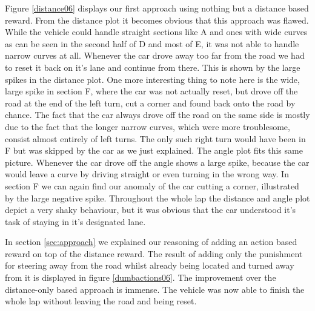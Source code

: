 Figure \ref{distance06} displays our first approach using nothing but a distance based reward. From the distance plot it becomes obvious that this approach was flawed. While the vehicle could handle straight sections like A and ones with wide curves as can be seen in the second half of D and most of E, it was not able to handle narrow curves at all. Whenever the car drove away too far from the road we had to reset it back on it's lane and continue from there. This is shown by the large spikes in the distance plot. One more interesting thing to note here is the wide, large spike in section F, where the car was not actually reset, but drove off the road at the end of the left turn, cut a corner and found back onto the road by chance. The fact that the car always drove off the road on the same side is mostly due to the fact that the longer narrow curves, which were more troublesome, consist almost entirely of left turns. The only such right turn would have been in F but was skipped by the car as we just explained. 
The angle plot fits this same picture. Whenever the car drove off the angle shows a large spike, because the car would leave a curve by driving straight or even turning in the wrong way. In section F we can again find our anomaly of the car cutting a corner, illustrated by the large negative spike.
Throughout the whole lap the distance and angle plot depict a very shaky behaviour, but it was obvious that the car understood it's task of staying in it's designated lane.

In section \ref{sec:approach} we explained our reasoning of adding an action based reward on top of the distance reward. The result of adding only the punishment for steering away from the road whilst already being located and turned away from it is displayed in figure \ref{dumbactions06}. The improvement over the distance-only based approach is immense. The vehicle was now able to finish the whole lap without leaving the road and being reset.

